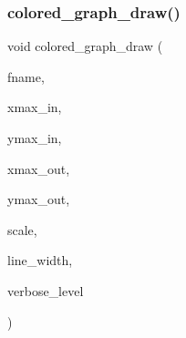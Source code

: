 \mbox{\label{_l_i_b_2_g_a_l_o_i_s_2colored__graph_8_c_ae8b578b6d3c09c831d76dd38e866d82a}} 
\subsubsection{\texorpdfstring{colored\+\_\+graph\+\_\+draw()}{colored\_graph\_draw()}}
{\footnotesize\ttfamily void colored\+\_\+graph\+\_\+draw (\begin{DoxyParamCaption}\item[{const \mbox{\hyperlink{galois_8h_ab6cc7b4aeb6ea31aba2b3fbfc83ff5e6}{B\+Y\+TE}} $\ast$}]{fname,  }\item[{\mbox{\hyperlink{galois_8h_a09fddde158a3a20bd2dcadb609de11dc}{I\+NT}}}]{xmax\+\_\+in,  }\item[{\mbox{\hyperlink{galois_8h_a09fddde158a3a20bd2dcadb609de11dc}{I\+NT}}}]{ymax\+\_\+in,  }\item[{\mbox{\hyperlink{galois_8h_a09fddde158a3a20bd2dcadb609de11dc}{I\+NT}}}]{xmax\+\_\+out,  }\item[{\mbox{\hyperlink{galois_8h_a09fddde158a3a20bd2dcadb609de11dc}{I\+NT}}}]{ymax\+\_\+out,  }\item[{double}]{scale,  }\item[{double}]{line\+\_\+width,  }\item[{\mbox{\hyperlink{galois_8h_a09fddde158a3a20bd2dcadb609de11dc}{I\+NT}}}]{verbose\+\_\+level }\end{DoxyParamCaption})}

